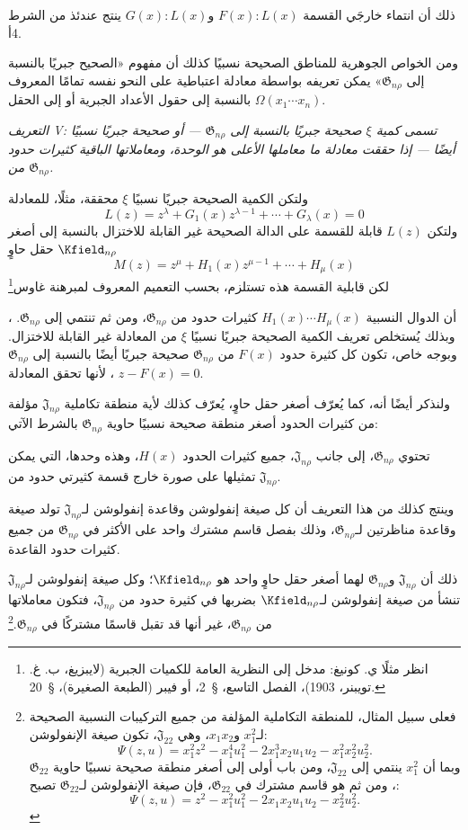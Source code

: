 \documentclass[11pt]{article}
\newcommand{\srcLTR}[1]{\relax\ifmmode\text{\mbox{\babelsublr{\foreignlanguage{english}{#1}}}}\else\babelsublr{\foreignlanguage{english}{#1}}\fi}
\newcommand{\srcfn}[2]{\begingroup\renewcommand{\thefootnote}{\srcLTR{#1}}\footnote{#2}\addtocounter{footnote}{-1}\endgroup}
\providecommand{\Jdom}{\mathfrak{J}}
\providecommand{\Gdom}{\mathfrak{G}}
\begin{document}
ذلك أن انتماء خارجَي القسمة $F(x):L(x)$ و$G(x):L(x)$ ينتج عندئذ من الشرط 4أ.

ومن الخواص الجوهرية للمناطق الصحيحة نسبيًا كذلك أن مفهوم «الصحيح جبريًا بالنسبة إلى $\Gdom_{n\rho}$» يمكن تعريفه بواسطة معادلة اعتباطية على النحو نفسه تمامًا المعروف بالنسبة إلى حقول الأعداد الجبرية أو إلى الحقل $\Omega(x_1\cdots x_n)$.

\emph{التعريف V: تسمى كمية $\xi$ صحيحة جبريًا بالنسبة إلى $\Gdom_{n\rho}$ --- أو صحيحة جبريًا نسبيًا أيضًا --- إذا حققت معادلة ما معاملها الأعلى هو الوحدة، ومعاملاتها الباقية كثيرات حدود من $\Gdom_{n\rho}$.}

ولتكن الكمية الصحيحة جبريًا نسبيًا $\xi$ محققة، مثلًا، للمعادلة
\[
L(z)=z^\lambda+G_1(x)z^{\lambda-1}+\cdots+G_\lambda(x)=0
\]
ولتكن $L(z)$ قابلة للقسمة على الدالة الصحيحة غير القابلة للاختزال بالنسبة إلى أصغر حقل حاوٍ $\Kfield_{n\rho}$
\[
M(z)=z^\mu+H_1(x)z^{\mu-1}+\cdots+H_\mu(x)
\]
لكن قابلية القسمة هذه تستلزم، بحسب التعميم المعروف لمبرهنة غاوس\srcfn{*)}{انظر مثلًا ي. كونيغ: مدخل إلى النظرية العامة للكميات الجبرية (لايبزيغ، ب. غ. تويبنر، 1903)، الفصل التاسع، \S\ 2، أو فيبر (الطبعة الصغيرة)، \S\ 20.}، أن الدوال النسبية $H_1(x)\cdots H_\mu(x)$ كثيرات حدود من $\Gdom_{n\rho}$، ومن ثم تنتمي إلى $\Gdom_{n\rho}$. وبذلك يُستخلص تعريف الكمية الصحيحة جبريًا نسبيًا $\xi$ من المعادلة غير القابلة للاختزال. وبوجه خاص، تكون كل كثيرة حدود $F(x)$ من $\Gdom_{n\rho}$ صحيحة جبريًا أيضًا بالنسبة إلى $\Gdom_{n\rho}$، لأنها تحقق المعادلة $z-F(x)=0$.

ولنذكر أيضًا أنه، كما يُعرّف أصغر حقل حاوٍ، يُعرّف كذلك لأية منطقة تكاملية $\Jdom_{n\rho}$ مؤلفة من كثيرات الحدود أصغر منطقة صحيحة نسبيًا حاوية $\Gdom_{n\rho}$ بالشرط الآتي:

تحتوي $\Gdom_{n\rho}$، إلى جانب $\Jdom_{n\rho}$، جميع كثيرات الحدود $H(x)$، وهذه وحدها، التي يمكن تمثيلها على صورة خارج قسمة كثيرتي حدود من $\Jdom_{n\rho}$.

وينتج كذلك من هذا التعريف أن كل صيغة إنفولوشن وقاعدة إنفولوشن لـ$\Jdom_{n\rho}$ تولد صيغة وقاعدة مناظرتين لـ$\Gdom_{n\rho}$، وذلك بفصل قاسم مشترك واحد على الأكثر في $\Gdom_{n\rho}$ من جميع كثيرات حدود القاعدة.

ذلك أن $\Jdom_{n\rho}$ و$\Gdom_{n\rho}$ لهما أصغر حقل حاوٍ واحد هو $\Kfield_{n\rho}$؛ وكل صيغة إنفولوشن لـ$\Jdom_{n\rho}$ تنشأ من صيغة إنفولوشن لـ$\Kfield_{n\rho}$ بضربها في كثيرة حدود من $\Jdom_{n\rho}$، فتكون معاملاتها من $\Gdom_{n\rho}$، غير أنها قد تقبل قاسمًا مشتركًا في $\Gdom_{n\rho}$.\srcfn{*)}{فعلى سبيل المثال، للمنطقة التكاملية المؤلفة من جميع التركيبات النسبية الصحيحة لـ$x_1^2$ و$x_1x_2$، وهي $\Jdom_{22}$، تكون صيغة الإنفولوشن:
\[
\Psi(z,u)=x_1^2z^2-x_1^4u_1^2-2x_1^3x_2u_1u_2-x_1^2x_2^2u_2^2.
\]
وبما أن $x_1^2$ ينتمي إلى $\Jdom_{22}$، ومن باب أولى إلى أصغر منطقة صحيحة نسبيًا حاوية $\Gdom_{22}$، ومن ثم هو قاسم مشترك في $\Gdom_{22}$، فإن صيغة الإنفولوشن لـ$\Gdom_{22}$ تصبح:
\[
\Psi(z,u)=z^2-x_1^2u_1^2-2x_1x_2u_1u_2-x_2^2u_2^2.
\]}
\end{document}
